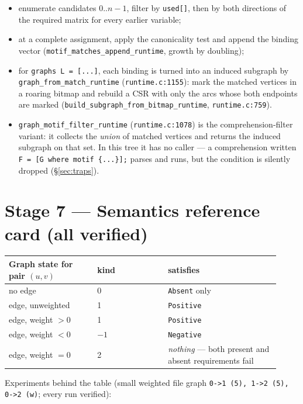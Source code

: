 \documentclass[11pt,a4paper]{article}
\newcommand{\code}[1]{\texttt{#1}}
\newcommand{\file}[1]{\texttt{#1}}
\begin{document}
\begin{itemize}
  \item enumerate candidates $0..n-1$, filter by \code{used[]}, then by both
        directions of the required matrix for every earlier variable;
  \item at a complete assignment, apply the canonicality test and append the
        binding vector (\code{motif\_matches\_append\_runtime}, growth by
        doubling);
  \item for \code{graphs L = [...]}, each binding is turned into an induced
        subgraph by \code{graph\_from\_match\_runtime}
        (\file{runtime.c:1155}): mark the matched vertices in a roaring bitmap
        and rebuild a CSR with only the arcs whose both endpoints are marked
        (\code{build\_subgraph\_from\_bitmap\_runtime}, \file{runtime.c:759}).
  \item \code{graph\_motif\_filter\_runtime} (\file{runtime.c:1078}) is the
        comprehension-filter variant: it collects the \emph{union} of matched
        vertices and returns the induced subgraph on that set. In this tree it
        has no caller --- a comprehension written \code{F = [G where motif
        \{...\}];} parses and runs, but the condition is silently dropped
        (\S\ref{sec:traps}).
\end{itemize}

\section{Stage 7 --- Semantics reference card (all verified)}
\label{sec:semantics}

\begin{center}
\begin{tabular}{@{}p{0.30\linewidth}p{0.24\linewidth}p{0.38\linewidth}@{}}
\toprule
Graph state for pair $(u,v)$ & kind & satisfies \\
\midrule
no edge & 0 & \code{Absent} only \\
edge, unweighted & 1 & \code{Positive} \\
edge, weight $>0$ & 1 & \code{Positive} \\
edge, weight $<0$ & $-1$ & \code{Negative} \\
edge, weight $=0$ & 2 & \emph{nothing} --- both present and absent requirements fail \\
\bottomrule
\end{tabular}
\end{center}

Experiments behind the table (small weighted file graph
\code{0->1 (5), 1->2 (5), 0->2 (w)}; every run verified):
\end{document}
